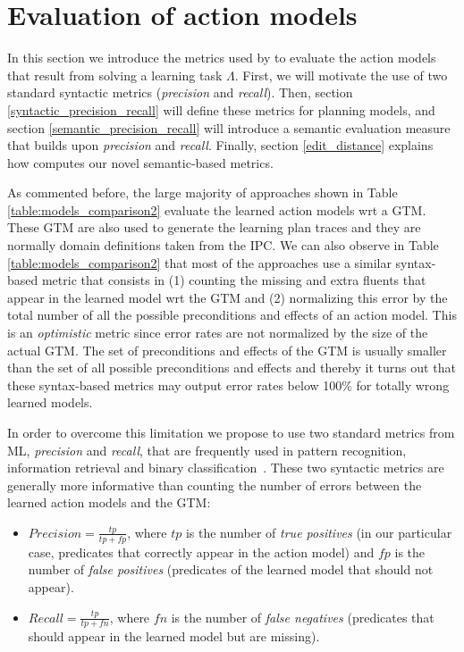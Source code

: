 
\section{Evaluation of action models}
\label{sec:evaluation}

In this section we introduce the metrics used by \FAMA to evaluate the action models that result from solving a learning task $\Lambda$. First, we will motivate the use of two standard syntactic metrics ({\em precision} and {\em recall}). Then, section \ref{syntactic_precision_recall} will define these metrics for planning models, and section \ref{semantic_precision_recall} will introduce a semantic evaluation measure that builds upon {\em precision} and {\em recall}. Finally, section \ref{edit_distance} explains how \FAMA computes our novel semantic-based metrics.

\textcolor[rgb]{1.00,0.00,0.00}{As commented before, the large majority of approaches shown in Table \ref{table:models_comparison2} evaluate the learned action models wrt a GTM. These GTM are also  used to generate the learning plan traces and they are normally domain definitions taken from the IPC.} We can also observe in Table \ref{table:models_comparison2} that most of the approaches use a similar syntax-based metric that consists in (1) counting the missing and extra fluents that appear in the learned model wrt the GTM and (2) normalizing this error by the total number of all the possible preconditions and effects of an action model. This is an \emph{optimistic} metric since error rates are not normalized by the size of the actual GTM. The set of preconditions and effects of the GTM is usually smaller than the set of all possible preconditions and effects and thereby it turns out that these syntax-based metrics may output error rates below 100\% for totally wrong learned models. 

In order to overcome this limitation we propose to use two standard metrics from ML, {\em precision} and {\em recall}, that are frequently used in pattern recognition, information retrieval and binary classification~\cite{davis2006relationship}. These two syntactic metrics are generally more informative than counting the number of errors between the learned action models and the GTM:


\begin{itemize}
\item $Precision=\frac{tp}{tp+fp}$, where $tp$ is the number of {\em true positives} (in our particular case, predicates that correctly appear in the action model) and $fp$ is the number of {\em false positives} (predicates of the learned model that should not appear).
\item $Recall=\frac{tp}{tp+fn}$, where $fn$ is the number of {\em false negatives} (predicates that should appear in the learned model but are missing).
\end{itemize}

